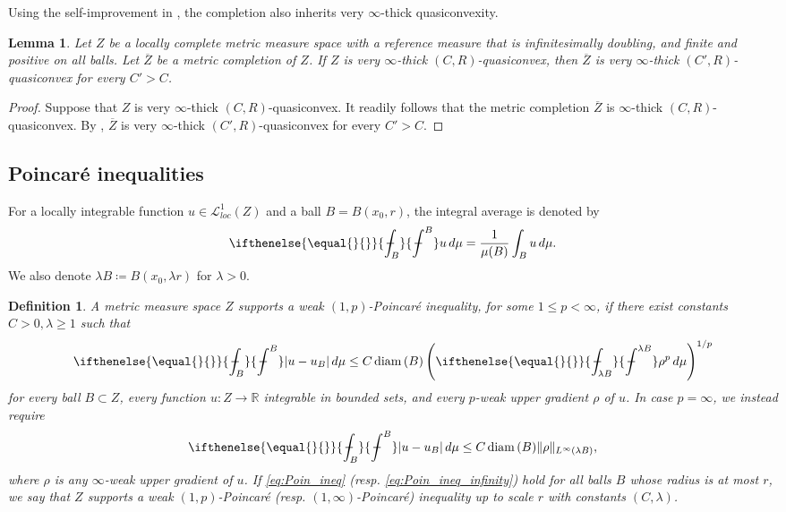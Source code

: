 \documentclass[reqno]{amsart}
\newcommand{\aint}[2][]{%
	\ifthenelse{\equal{#1}{}}%
					{%
\mathchoice%
      {\mathop{\kern 0.2em\vrule width 0.6em height 0.69678ex depth -0.58065ex
              \kern -0.8em \intop}\nolimits_{\kern -0.45em#2}^{#1}}%
      {\mathop{\kern 0.1em\vrule width 0.5em height 0.69678ex depth -0.60387ex
              \kern -0.6em \intop}\nolimits_{#2}^{#1}}%
      {\mathop{\kern 0.1em\vrule width 0.5em height 0.69678ex depth -0.60387ex
              \kern -0.6em \intop}\nolimits_{#2}^{#1}}%
      {\mathop{\kern 0.1em\vrule width 0.5em height 0.69678ex depth -0.60387ex
              \kern -0.6em \intop}\nolimits_{#2}^{#1}}}%
					{%
\mathchoice%
      {\mathop{\kern 0.2em\vrule width 0.6em height 0.69678ex depth -0.58065ex
              \kern -0.8em \intop}\nolimits_{\kern -0.45em#1}^{#2}}%
      {\mathop{\kern 0.1em\vrule width 0.5em height 0.69678ex depth -0.60387ex
              \kern -0.6em \intop}\nolimits_{#1}^{#2}}%
      {\mathop{\kern 0.1em\vrule width 0.5em height 0.69678ex depth -0.60387ex
              \kern -0.6em \intop}\nolimits_{#1}^{#2}}%
      {\mathop{\kern 0.1em\vrule width 0.5em height 0.69678ex depth -0.60387ex
              \kern -0.6em \intop}\nolimits_{#1}^{#2}}}}
\numberwithin{equation}{section}
\newtheorem{lemma}[theorem]{Lemma}
\newtheorem{definition}[theorem]{Definition}
\theoremstyle{remark}
\DeclareMathOperator{\diam}{diam}
\newcommand{\R}{\mathbb{R}}
\def\diam{{\mathop\mathrm{\,diam\,}}}
\def\dfrac{\displaystyle\frac}
\begin{document}
Using the self-improvement in , the completion also inherits very $\infty$-thick quasiconvexity.
\begin{lemma}\label{lemm:equivalence:completion}
Let $Z$ be a locally complete metric measure space with a reference measure that is infinitesimally doubling, and finite and positive on all balls. Let $\overline{Z}$ be a metric completion of $Z$. If $Z$ is very $\infty$-thick $(C,R)$-quasiconvex, then $\overline{Z}$ is very $\infty$-thick $(C',R)$-quasiconvex for every $C' > C$.
\end{lemma}
\begin{proof}
Suppose that $Z$ is very $\infty$-thick $(C,R)$-quasiconvex. It readily follows that the metric completion $\overline{Z}$ is $\infty$-thick $(C,R)$-quasiconvex. By , $\overline{Z}$ is very $\infty$-thick $(C',R)$-quasiconvex for every $C' > C$.
\end{proof}




\subsection{Poincaré inequalities}
For a locally integrable function $u\in\mathcal L^{1}_{loc}(Z)$ and a ball $B = B( x_0, r )$, the integral average is denoted by
 $$\aint{B}u \, d\mu=\dfrac{1}{\mu(B)}\int_{B} u\, d\mu. $$
We also denote $\lambda B \coloneqq B( x_0, \lambda r )$ for $\lambda > 0$.
 
\begin{definition}\label{def:PI-ineq}
A metric measure space $Z$ supports a weak $(1,p)$-Poincaré inequality, for some $1\leq p<\infty$, if there exist constants $C>0,\lambda\geq 1$ such that
\begin{equation}\label{eq:Poin_ineq}
    \aint{B} |u-u_B|\,d\mu\leq C\diam (B)\left(\aint{\lambda B} \rho^p\,d\mu  \right)^{1/p}
\end{equation}
for every ball $B\subset Z$, every function $u\colon Z\to \R$ integrable in bounded sets, and every $p$-weak upper gradient $\rho$ of $u$. In case $p=\infty$, we instead require
\begin{equation}\label{eq:Poin_ineq_infinity}
    \aint{B} |u-u_B|\,d\mu\leq C\diam (B)\| \rho\|_{L^{\infty}(\lambda B)},
\end{equation}
where $\rho$ is any $\infty$-weak upper gradient of $u$. If \eqref{eq:Poin_ineq} (resp. \eqref{eq:Poin_ineq_infinity}) hold for all balls $B$ whose radius is at most $r$, we say that $Z$ supports a weak $(1,p)$-Poincaré (resp. $(1,\infty)$-Poincaré) inequality up to scale $r$ with constants $(C,\lambda)$.
\end{definition}
\end{document}
